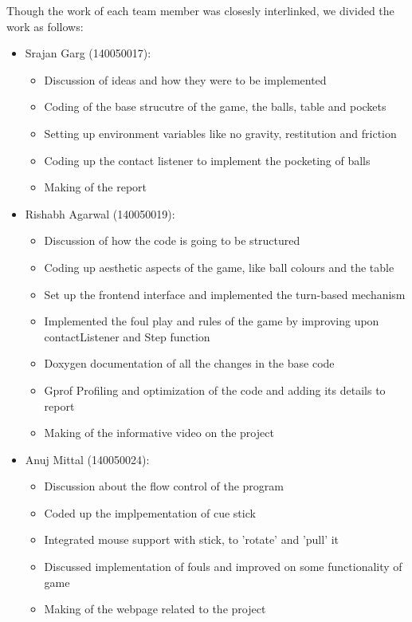 \documentclass[a4paper,12pt]{article}
\begin{document}
Though the work of each team member was closesly interlinked, we divided the work as follows:
\begin{itemize}
  
  \item Srajan Garg (140050017): 
  \vspace{-0.2cm}
  \begin{itemize}
  	\setlength{\itemsep}{-0.1cm}
  	\item Discussion of ideas and how they were to be implemented
  	\item Coding of the base strucutre of the game, the balls, table and pockets
  	\item Setting up environment variables like no gravity, restitution and friction
  	\item Coding up the contact listener to implement the pocketing of balls
  	\item Making of the report
  \end{itemize}
  \vspace{-0.2cm}

  \item Rishabh Agarwal (140050019):
  \vspace{-0.2cm} 
  \begin{itemize}
  	\setlength{\itemsep}{-0.1cm}
  	\item Discussion of how the code is going to be structured
  	\item Coding up aesthetic aspects of the game, like ball colours and the table
  	\item Set up the frontend interface and implemented the turn-based mechanism
  	\item Implemented the foul play and rules of the game by improving upon contactListener and Step function 
    \item Doxygen documentation of all the changes in the base code
    \item Gprof Profiling and optimization of the code and adding its details to report 
  	\item Making of the informative video on the project
  \end{itemize}
  \vspace{-0.2cm}

  \item Anuj Mittal (140050024): 
  \vspace{-0.2cm}
  \begin{itemize}
  	\setlength{\itemsep}{-0.1cm}
  	\item Discussion about the flow control of the program
  	\item Coded up the implpementation of cue stick
  	\item Integrated mouse support with stick, to 'rotate' and 'pull' it
  	\item Discussed implementation of fouls and improved on some functionality of game
  	\item Making of the webpage related to the project
  \end{itemize}
  \vspace{-0.2cm}

\end{itemize}
\end{document}
